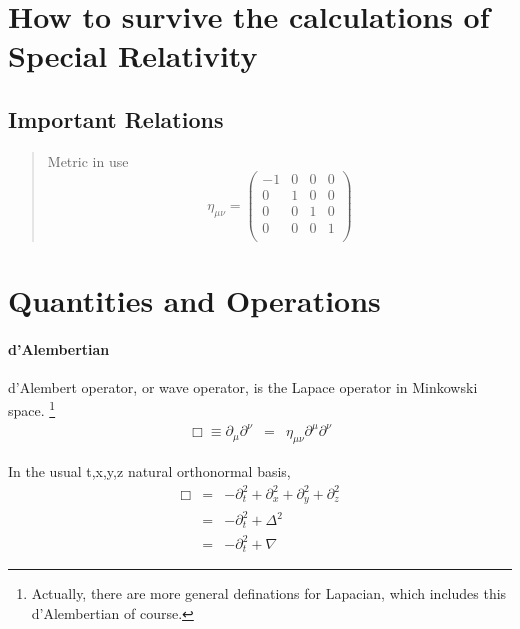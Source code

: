 \section{How to survive the calculations of Special Relativity}

\subsection{Important Relations}
\begin{quotation}
Metric in use
\begin{equation}\eta_{\mu\nu}=\left(\begin{matrix}
	-1 & 0 & 0 & 0\\
	0 & 1 & 0 & 0\\
	0 & 0 & 1 & 0\\
	0 & 0 & 0 & 1\\
\end{matrix}\right)\end{equation}
\end{quotation}




\section{Quantities and Operations}

\paragraph{d'Alembertian}
d'Alembert operator, or wave operator, is the Lapace operator in Minkowski space.
\footnote{Actually, there are more general definations for Lapacian, which includes this d'Alembertian of course.}
\begin{eqnarray}
\Box\equiv \partial_\mu\partial^\nu&=&\eta_{\mu\nu}\partial^\mu \partial^\nu
\end{eqnarray}

In the usual {t,x,y,z} natural orthonormal basis,
\begin{eqnarray}
 \Box&=&-\partial_t^2+\partial_x^2+\partial_y^2+\partial_z^2 \\
&=&-\partial_t^2+\Delta^2 \\
&=&-\partial_t^2+\nabla
\end{eqnarray}

